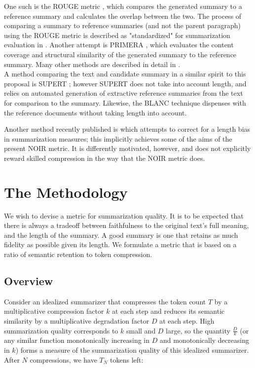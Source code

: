 \documentclass{article}
\begin{document}
One such is the ROUGE metric \citep{lin_rouge_2004}, which compares the generated summary to a reference summary and calculates the overlap between the two.
The process of comparing a summary to reference summaries (and not the parent paragraph) using the ROUGE metric is described as "standardized" for summarization evaluation in \citep{fabbri_summeval_2021}.
Another attempt is PRIMERA \citep{xiao_primera_2022}, which evaluates the content coverage and structural similarity of the generated summary to the reference summary.  
Many other methods are described in detail in \citep{fabbri_summeval_2021}.
\\
A method comparing the text and candidate summary in a similar spirit to this proposal is SUPERT \citep{supert}; however SUPERT does not take into account length, and relies on automated generation of extractive reference summaries from the text for comparison to the summary.  Likewise, the BLANC \citep{vasilyev-etal-2020-fill} technique dispenses with the reference documents without taking length into account.

Another method recently published is \citep{guo-vosoughi-2023-length} which attempts to correct for a length bias in summarization measures; this implicitly achieves some of the aims of the present NOIR metric.  It is differently motivated, however, and does not explicitly reward skilled compression in the way that the NOIR metric does.

\section{The Methodology}

We wish to devise a metric for summarization quality. 
It is to be expected that there is always a tradeoff between faithfulness to the original text's full meaning, and the length of the summary.
A good summary is one that retains as much fidelity as possible given its length.
We formulate a metric that is based on a ratio of semantic retention to token compression.

\subsection{Overview}
Consider an idealized summarizer that compresses the token count $T$ by a multiplicative compression factor $k$ at each step and reduces its semantic similarity by a multiplicative degradation factor $D$ at each step.  
High summarization quality corresponds to $k$ small and $D$ large, so the quantity $\frac{D}{k}$ (or any similar function monotonically increasing in $D$ and monotonically decreasing in $k$) forms a measure of the summarization quality of this idealized summarizer. After $N$ compressions, we have $T_N$ tokens left:
\end{document}
